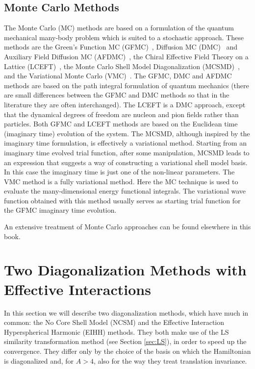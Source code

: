 \subsection{Monte Carlo Methods}\label{sec:MC}

The Monte Carlo (MC) methods are based on a formulation of the quantum mechanical many-body problem
which is suited to a stochastic approach.  These methods are
the Green's Function MC (GFMC)~\cite{Ka62},  Diffusion MC (DMC)~\cite{Ca87} and Auxiliary Field Diffusion MC (AFDMC)~\cite{ScF99}, 
the Chiral Effective Field Theory on a Lattice (LCEFT)~\cite{Le09},
the Monte Carlo Shell Model Diagonalization (MCSMD)~\cite{KoD97,HoM95,OtH01}, 
and the Variational Monte Carlo (VMC)~\cite{PiW01}. 
The GFMC, DMC and AFDMC methods are based on the path integral formulation of quantum mechanics
(there are small differences between the GFMC and DMC methods so that in the literature they are often interchanged).
The LCEFT is  a DMC approach, except that the dynamical degrees of freedom are nucleon and pion fields rather than particles.
Both GFMC and LCEFT methods are based on the Euclidean time (imaginary time) evolution of the system.  
The MCSMD, although inspired by the imaginary time formulation, is  effectively a variational method. 
Starting from an  imaginary time evolved trial function,  after some manipulation,  MCSMD leads to an expression that suggests 
a way of constructing a variational shell model basis. In this case the imaginary time is just one of the non-linear parameters.
The  VMC method is a fully variational method. Here the MC technique is used to evaluate 
the many-dimensional energy functional integrals. The variational wave function  obtained with this method  
usually serves as starting trial function for the GFMC imaginary time evolution.

An extensive treatment of   Monte Carlo approaches can be found elsewhere in this book.

\section{Two Diagonalization Methods with Effective Interactions}\label{sec:TWOEI}

In this section we will describe two diagonalization methods, which have much in common: the No Core Shell Model (NCSM) 
and the Effective Interaction Hyperspherical Harmonic (EIHH) methods. They  both make use of the LS similarity transformation method  
 (see Section \ref{sec:LS}), in order to speed up the convergence. 
They differ only by the choice of the basis on which the Hamiltonian is diagonalized and, 
for $A > 4$, also for the way they treat translation invariance. 


